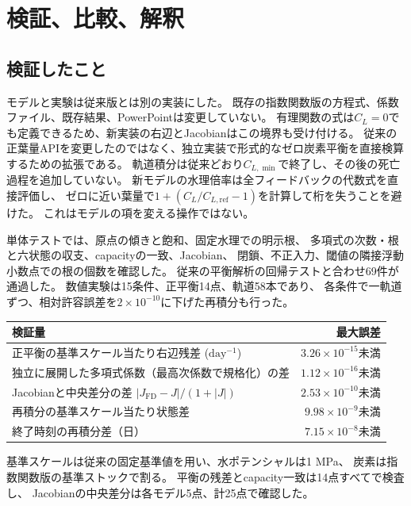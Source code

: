 \documentclass[a4paper,11pt]{ltjsarticle}
\begin{document}
\section{検証、比較、解釈}
\subsection{検証したこと}
モデルと実験は従来版とは別の実装にした。
既存の指数関数版の方程式、係数ファイル、既存結果、PowerPointは変更していない。
有理関数の式は$C_L=0$でも定義できるため、新実装の右辺とJacobianはこの境界も受け付ける。
従来の正葉量APIを変更したのではなく、独立実装で形式的なゼロ炭素平衡を直接検算するための拡張である。
軌道積分は従来どおり$C_{L,\min}$で終了し、その後の死亡過程を追加していない。
新モデルの水理倍率は全フィードバックの代数式を直接評価し、
ゼロに近い葉量で$1+(C_L/C_{L,\mathrm{ref}}-1)$を計算して桁を失うことを避けた。
これはモデルの項を変える操作ではない。

単体テストでは、原点の傾きと飽和、固定水理での明示根、
多項式の次数・根と六状態の収支、capacityの一致、Jacobian、
閉鎖、不正入力、閾値の隣接浮動小数点での根の個数を確認した。
従来の平衡解析の回帰テストと合わせ69件が通過した。
数値実験は15条件、正平衡14点、軌道58本であり、
各条件で一軌道ずつ、相対許容誤差を$2\times10^{-10}$に下げた再積分も行った。
\begin{center}\small
\begin{tabular}{l r}\toprule
検証量&最大誤差\\\midrule
正平衡の基準スケール当たり右辺残差 ($\mathrm{day^{-1}}$)&$3.26\times10^{-15}$未満\\
独立に展開した多項式係数（最高次係数で規格化）の差&$1.12\times10^{-16}$未満\\
Jacobianと中央差分の差 $|J_{\mathrm{FD}}-J|/(1+|J|)$&$2.53\times10^{-10}$未満\\
再積分の基準スケール当たり状態差&$9.98\times10^{-9}$未満\\
終了時刻の再積分差（日）&$7.15\times10^{-8}$未満\\\bottomrule
\end{tabular}
\end{center}
基準スケールは従来の固定基準値を用い、水ポテンシャルは1 MPa、
炭素は指数関数版の基準ストックで割る。
平衡の残差とcapacity一致は14点すべてで検査し、
Jacobianの中央差分は各モデル5点、計25点で確認した。
\end{document}
